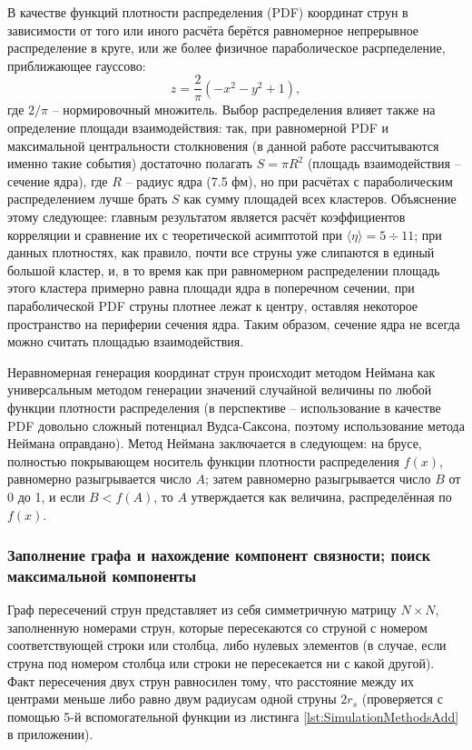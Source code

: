 В качестве функций плотности распределения (PDF) координат струн в зависимости от того или иного расчёта берётся равномерное непрерывное распределение в круге, или же более физичное параболическое расрпеделение, приближающее гауссово:
\begin{equation} \label{eq:parab}
	z = \frac{2}{\pi} (-x^2 - y^2 + 1),
\end{equation}
где $2/\pi$ -- нормировочный множитель. 
Выбор распределения влияет также на определение площади взаимодействия: так, при равномерной PDF и максимальной центральности столкновения (в данной работе рассчитываются именно такие события) достаточно полагать $S = \pi R^2$ (площадь взаимодействия -- сечение ядра), где $R$ -- радиус ядра (7.5 фм), но при расчётах с параболическим распределением лучше брать $S$ как сумму площадей всех кластеров. 
Объяснение этому следующее: главным результатом является расчёт коэффициентов корреляции и сравнение их с теоретической асимптотой \cite{dissert} при $\langle \eta \rangle = 5 \div 11$; при данных плотностях, как правило, почти все струны уже слипаются в единый большой кластер, и, в то время как при равномерном распределении площадь этого кластера примерно равна площади ядра в поперечном сечении, при параболической PDF струны плотнее лежат к центру, оставляя некоторое пространство на периферии сечения ядра. 
Таким образом, сечение ядра не всегда можно считать площадью взаимодействия.

Неравномерная генерация координат струн происходит методом Неймана как универсальным методом генерации значений случайной величины по любой функции плотности распределения (в перспективе -- использование в качестве PDF довольно сложный потенциал Вудса-Саксона, поэтому использование метода Неймана оправдано). Метод Неймана заключается в следующем: на брусе, полностью покрывающем носитель функции плотности распределения $f(x)$, равномерно разыгрывается число $A$; затем равномерно разыгрывается число $B$ от 0 до 1, и если $B < f(A)$, то $A$ утверждается как величина, распределённая по $f(x)$.
\subsubsection{Заполнение графа и нахождение компонент связности; поиск максимальной компоненты}
Граф пересечений струн представляет из себя симметричную матрицу $N \times N$, заполненную номерами струн, которые пересекаются со струной с номером соответствующей строки или столбца, либо нулевых элементов (в случае, если струна под номером столбца или строки не пересекается ни с какой другой). Факт пересечения двух струн равносилен тому, что расстояние между их центрами меньше либо равно двум радиусам одной струны $2r_s$ (проверяется с помощью 5-й вспомогательной функции из листинга \ref{lst:SimulationMethodsAdd} в приложении). 

